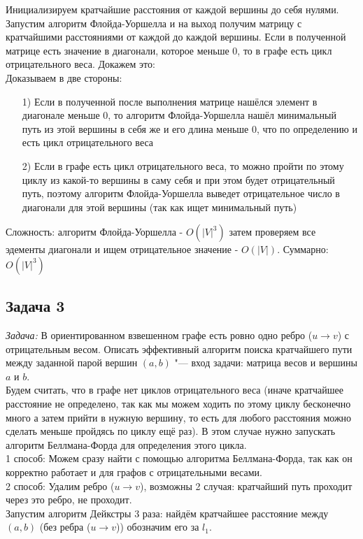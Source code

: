 \documentclass[a4paper,12pt]{article} %
\begin{document}
Инициализируем кратчайшие расстояния от каждой вершины до себя нулями. Запустим алгоритм Флойда-Уоршелла и на выход получим матрицу с кратчайшими расстояниями от каждой до каждой вершины. Если в полученной матрице есть значение в диагонали, которое меньше 0, то в графе есть цикл отрицательного веса. Докажем это:\\
Доказываем в две стороны:\\
\begin{itemize}
\item[1) ] Если в полученной после выполнения матрице нашёлся элемент в диагонале меньше 0, то алгоритм Флойда-Уоршелла нашёл минимальный путь из этой вершины в себя же и его длина меньше 0, что по определению и есть цикл отрицательного веса
\item[2) ] Если в графе есть цикл отрицательного веса, то можно пройти по этому циклу из какой-то вершины в саму себя и при этом будет отрицательный путь, поэтому алгоритм Флойда-Уоршелла выведет отрицательное число в диагонали для этой вершины (так как ищет минимальный путь)
\end{itemize}

Сложность: алгоритм Флойда-Уоршелла - $ O(|V|^3) $ затем проверяем все эдементы диагонали и ищем отрицательное значение - $ O(|V|) $. Суммарно: $ O(|V|^3) $


\subsection*{Задача 3}
\textit{Задача:} В ориентированном взвешенном графе есть ровно одно ребро ($u \to v$) с отрицательным весом. Описать эффективный алгоритм поиска кратчайшего пути между заданной парой вершин $(a,b)$ "--- вход задачи: матрица весов и вершины $a$ и $b$.\\

Будем считать, что в графе нет циклов отрицательного веса (иначе кратчайшее расстояние не определено, так как мы можем ходить по этому циклу бесконечно много а затем прийти в нужную вершину, то есть для любого расстояния можно сделать меньше пройдясь по циклу ещё раз). В этом случае нужно запускать алгоритм Беллмана-Форда для определения этого цикла.\\

1 способ: Можем сразу найти с помощью алгоритма Беллмана-Форда, так как он корректно работает и для графов с отрицательными весами.\\

2 способ: Удалим ребро ($u \to v$), возможны 2 случая: кратчайший путь проходит через это ребро, не проходит.\\ 
Запустим алгоритм Дейкстры 3 раза: найдём кратчайшее расстояние между $ (a,b) $ (без ребра ($u \to v$)) обозначим его за $ l_1 $.\\
\end{document}
